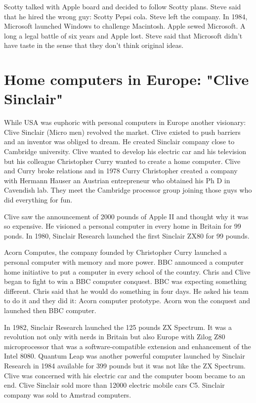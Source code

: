  Scotty talked with Apple board and decided to follow Scotty plans. 
 Steve said that he hired the wrong guy: Scotty Pepsi cola.  Steve left the company.   
 In 1984, Microsoft launched Windows to challenge Macintosh.    
 Apple sewed Microsoft. A long a legal battle of six years and  Apple lost. 
 Steve said that Microsoft didn't have taste 
 in the sense that they don't think original ideas. 
   
   
   
   
    
 \section*{Home computers in Europe: "Clive Sinclair"} 
 While USA was euphoric with personal computers in Europe another visionary: 
 Clive Sinclair (Micro men) revolved the market.    
 Clive existed to push barriers and an inventor was obliged to dream. 
 He created Sinclair company close to Cambridge university. 
 Clive wanted to develop his electric car and his television but his colleague 
 Christopher Curry wanted to create a home computer.   
 Clive and Curry broke relations and in 1978 Curry Christopher created
 a company with Hermann Hauser an Austrian entrepreneur  who obtained his Ph D in Cavendish
 lab. They meet the Cambridge processor group joining those guys who did everything for fun. 
    
    
 Clive saw the announcement of 2000 pounds of Apple II and thought why it was so expensive. 
 He visioned a personal computer in every home in Britain for 99 ponds.
 In 1980, Sinclair Research launched the first Sinclair ZX80 for 99 pounds.  
  
    
 Acorn Computes, the company founded by Christopher Curry launched a personal computer 
 with memory and more power.   
 BBC announced a computer home initiative to put a computer in every school of the country.    
 Chris and Clive began to fight to win a  BBC computer conquest. 
 BBC was expecting something different. Chris said that he would do something in four days. 
 He asked his team to do it and they did it:  Acorn computer prototype. 
 Acorn won the conquest and launched then BBC computer. 
 
 In 1982, Sinclair Research launched the 125 pounds ZX Spectrum. 
 It was a revolution not only with nerds in Britain but also Europe with Zilog Z80 microprocessor that was a 
 software-compatible extension and enhancement of the Intel 8080. 
 Quantum Leap was another powerful computer launched by Sinclair Research  in 
 1984 available for 399 pounds but it was not like the ZX Spectrum. 
 Clive was concerned with his electric car and the computer boom became to an end. 
 Clive Sinclair sold more than 12000 electric mobile cars C5.  
 Sinclair company was sold to Amstrad computers. 
 
